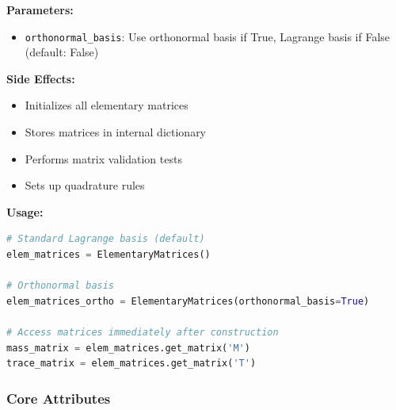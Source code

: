 \textbf{Parameters:}
\begin{itemize}
    \item \texttt{orthonormal\_basis}: Use orthonormal basis if True, Lagrange basis if False (default: False)
\end{itemize}

\textbf{Side Effects:}
\begin{itemize}
    \item Initializes all elementary matrices
    \item Stores matrices in internal dictionary
    \item Performs matrix validation tests
    \item Sets up quadrature rules
\end{itemize}

\textbf{Usage:}
\begin{lstlisting}[language=Python, caption=Constructor Usage Examples]
# Standard Lagrange basis (default)
elem_matrices = ElementaryMatrices()

# Orthonormal basis
elem_matrices_ortho = ElementaryMatrices(orthonormal_basis=True)

# Access matrices immediately after construction
mass_matrix = elem_matrices.get_matrix('M')
trace_matrix = elem_matrices.get_matrix('T')
\end{lstlisting}

\subsubsection{Core Attributes}

